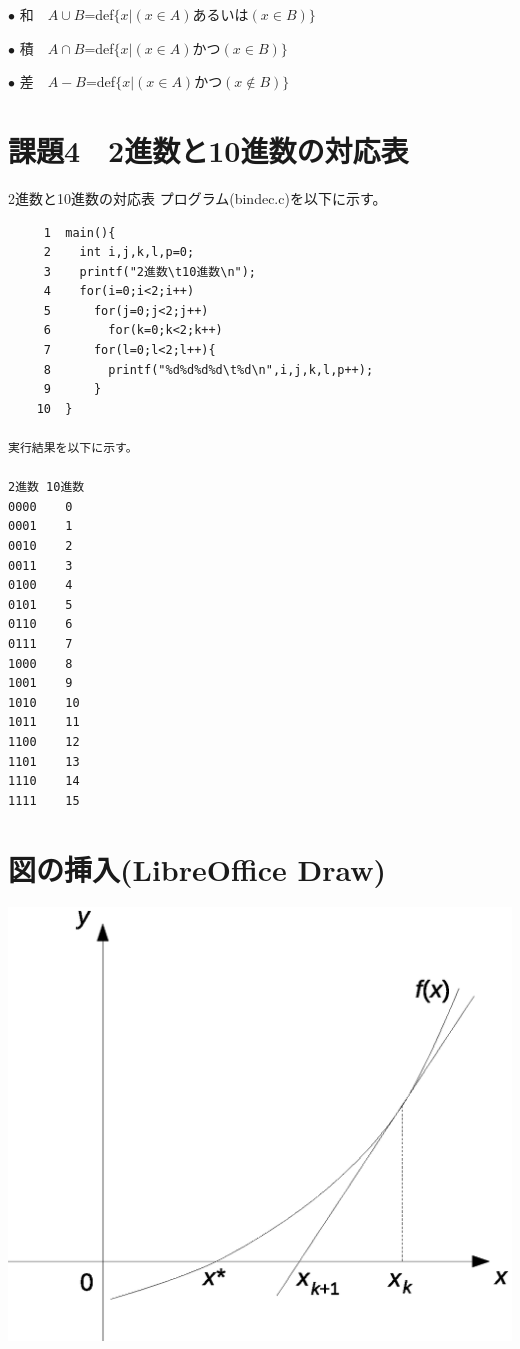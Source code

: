 \documentclass[11pt]{jarticle}
\begin{document}
$\bullet$ 和　$A \cup B$=def$\{x|(x \in A)あるいは(x \in B)\}$

$\bullet$ 積　$A \cap B$=def$\{x|(x \in A)かつ(x \in B)\}$

$\bullet$ 差　$A-B$=def$\{x|(x \in A)かつ(x \notin B)\}$
\section{課題4　2進数と10進数の対応表}
2進数と10進数の対応表
プログラム(bindec.c)を以下に示す。
\begin{verbatim}
     1	main(){
     2	  int i,j,k,l,p=0;
     3	  printf("2進数\t10進数\n");
     4	  for(i=0;i<2;i++)
     5	    for(j=0;j<2;j++)
     6	      for(k=0;k<2;k++)
     7		for(l=0;l<2;l++){
     8		  printf("%d%d%d%d\t%d\n",i,j,k,l,p++);
     9		}
    10	}

実行結果を以下に示す。

2進数	10進数
0000	0
0001	1
0010	2
0011	3
0100	4
0101	5
0110	6
0111	7
1000	8
1001	9
1010	10
1011	11
1100	12
1101	13
1110	14
1111	15

\end{verbatim}

\section{図の挿入(LibreOffice Draw)}
\includegraphics{figure2.eps}
\end{document}
